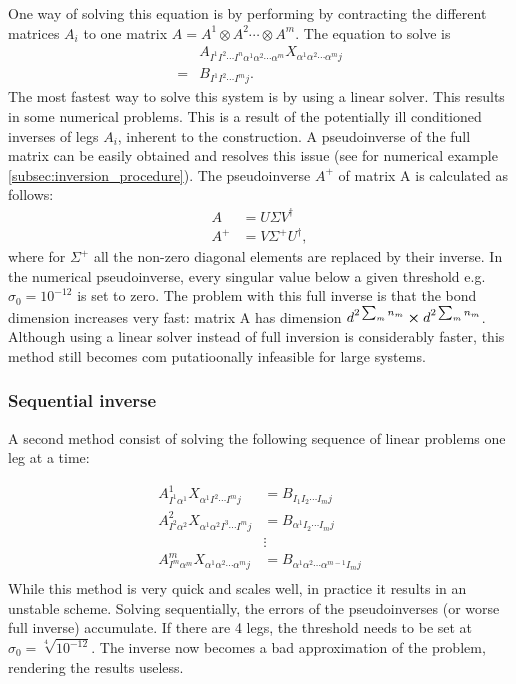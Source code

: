 One way of solving this equation is by performing by contracting the different matrices $A_i$ to one matrix $A = A^1 \otimes A^2 \cdots \otimes A^m$. The equation to solve is
\begin{equation}
    \begin{split}
        &A_{ I^1  I^2 \cdots I^n \alpha^1 \alpha^2 \cdots \alpha^m   } X_{ \alpha^1 \alpha^2 \cdots \alpha^m j  } \\
        = &B_{  I^1  I^2 \cdots I^m   j } .
    \end{split}
\end{equation}
The most fastest way to solve this system is by using a linear solver. This results in some numerical problems. This is a result of the potentially ill conditioned inverses of legs $A_i$, inherent to the construction. A pseudoinverse of the full matrix can be easily obtained and resolves this issue (see for numerical example \cref{subsec:inversion_procedure}).
The pseudoinverse $A^{+}$ of matrix A is calculated as follows:
\begin{align}
    A     & = U \Sigma V^{\dagger}      \\
    A^{+} & = V \Sigma^{+} U^{\dagger},
\end{align}
where for $\Sigma^{+}$ all the non-zero diagonal elements are replaced by their inverse. In the numerical pseudoinverse, every singular value below a given threshold e.g. $\sigma_0 = 10^{-12}$ is set to zero. The problem with this full inverse is that the bond dimension increases very fast: matrix A has dimension $d^ {2 \sum_m n_m } \cross d^ {2 \sum_m n_m } $. Although using a linear solver instead of full inversion is considerably faster, this method still becomes com putatioonally infeasible for large systems.

\subsubsection{Sequential inverse}

A second method consist of solving the following sequence of linear problems one leg at a time:

\begin{equation}
    \begin{split}
        A^1_{ I^1 \alpha^1 } X_{ \alpha^1  I^2 \cdots I^m j} &=  B_{  I_1  I_2 \cdots I_m   j }\\
        A^2_{ I^2 \alpha^2 } X_{ \alpha^1   \alpha^2  I^3 \cdots I^m j} &=  B_{  \alpha^1  I_2 \cdots I_m   j }\\
        &\vdots\\
        A^m_{ I^m \alpha^m } X_{ \alpha^1 \alpha^2 \cdots \alpha^m j  } &=  B_{ \alpha^1 \alpha^2 \cdots \alpha^{m-1} I_m   j }\\
    \end{split}
\end{equation}
While this method is very quick and scales well, in practice it results in an unstable scheme. Solving sequentially, the errors of the pseudoinverses (or worse full inverse) accumulate. If there are 4 legs, the threshold needs to be set at $ \sigma_0 = \sqrt[4]{ 10^{-12} } $. The inverse now becomes a bad approximation of the problem, rendering the results useless.

